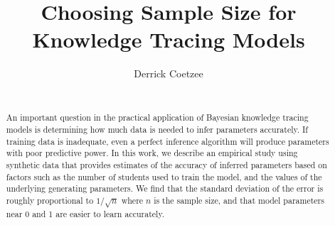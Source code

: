 \documentclass{edm_template}
\begin{document}
\title{Choosing Sample Size for Knowledge Tracing Models
}

\author{
\alignauthor
Derrick Coetzee\\
       \\
}

\maketitle
\begin{abstract}
An important question in the practical application of Bayesian knowledge
tracing models is determining how much data is needed to infer
parameters accurately. If training data is inadequate, even a perfect
inference algorithm will produce parameters with poor predictive
power. In this work, we describe an empirical study using synthetic
data that provides estimates of the accuracy of inferred parameters
based on factors such as the number of students used to train the model,
and the values of the underlying generating parameters. We find that
the standard deviation of the error is roughly proportional to $1/\sqrt{n}$ where
$n$ is the sample size, and that model parameters near 0 and 1 are easier
to learn accurately.
\end{abstract}

%


\end{document}

